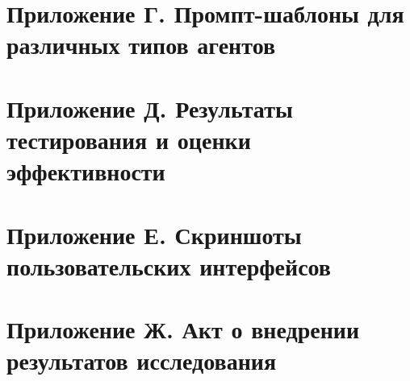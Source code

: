 \documentclass{syksu-coursework}
\begin{document}
\newpage

\section*{Приложение Г. Промпт-шаблоны для различных типов агентов}

\newpage

\section*{Приложение Д. Результаты тестирования и оценки эффективности}

\newpage

\section*{Приложение Е. Скриншоты пользовательских интерфейсов}

\newpage

\section*{Приложение Ж. Акт о внедрении результатов исследования}
\end{document}
